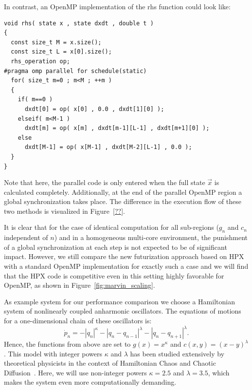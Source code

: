 \documentclass[a4wide,10pt]{scrartcl}
\begin{document}
In contrast, an OpenMP implementation of the rhs function could look like:
\begin{lstlisting}
void rhs( state x , state dxdt , double t )
{
  const size_t M = x.size();
  const size_t L = x[0].size();
  rhs_operation op;
#pragma omp parallel for schedule(static)
  for( size_t m=0 ; m<M ; ++m )
  {
    if( m==0 )
      dxdt[0] = op( x[0] , 0.0 , dxdt[1][0] );
    elseif( m<M-1 )
      dxdt[m] = op( x[m] , dxdt[m-1][L-1] , dxdt[m+1][0] );
    else
      dxdt[M-1] = op( x[M-1] , dxdt[M-2][L-1] , 0.0 );
  }
}
\end{lstlisting}
Note that here, the parallel code is only entered when the full state $\vec x$ is calculated completely.
Additionally, at the end of the parallel OpenMP region a global synchronization takes place.
The difference in the execution flow of these two methods is visualized in Figure~\ref{??}.

It is clear that for the case of identical computation for all sub-regions ($g_n$ and $c_n$ independent of $n$) and in a homogeneous multi-core environment, the punishment of a global synchronization at each step is not expected to be of significant impact.
However, we still compare the new futurization approach based on HPX with a standard OpenMP implementation for exactly such a case and we will find that the HPX code is competitive even in this setting highly favorable for OpenMP, as shown in Figure~\ref{fig:marvin_scaling}.

As example system for our performance comparison we choose a Hamiltonian system of nonlinearly coupled anharmonic oscillators.
The equations of motions for a one-dimensional chain of these oscillators is:
\begin{equation}
 \dot p_n = -|q_n|^\kappa - |q_n-q_{n-1}|^\lambda - |q_n-q_{n+1}|^\lambda.
\end{equation} 
Hence, the functions from above are set to $g(x) = x^\kappa$ and $c(x,y)=(x-y)^\lambda$.
This model with integer powers $\kappa$ and $\lambda$ has been studied extensively by theoretical physicists in the context of Hamiltonian Chaos and Chaotic Diffusion~\cite{blabla}.
Here, we will use non-integer powers $\kappa=2.5$ and $\lambda=3.5$, which makes the system even more computationally demanding.
\end{document}
